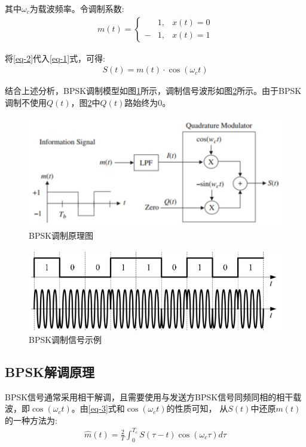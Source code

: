 \documentclass[12pt]{ctexart}
\begin{document}
\noindent 其中$\omega_c$为载波频率。令调制系数:
\begin{align}
	m(t) = 
	\left\{\begin{aligned}
		& 1, & x(t) = 0 \\
		−&1, & x(t) = 1
	\end{aligned}\right.
	\label{eq-2}
\end{align}

\noindent 将\eqref{eq-2}代入\eqref{eq-1}式，可得:
\begin{align}
	S(t) = m(t) \cdot \cos(\omega_c t)
	\label{eq-3}
\end{align}

	结合上述分析，BPSK调制模型如图\ref{mod-prin}所示，调制信号波形如图\ref{mod-exp}所示。由于BPSK调制不使用$Q(t)$，图\ref{mod-exp}中$Q(t)$路始终为$0$。

\begin{figure}[htbp]
	\centering
 	\includegraphics[scale=0.5]{../figures/mod-prin.png}
	\caption{BPSK调制原理图}
	\label{mod-prin}
\end{figure}

\begin{figure}[htbp]
	\centering
 	\includegraphics[scale=0.5]{../figures/mod-exp.png}
	\caption{BPSK调制信号示例}
	\label{mod-exp}
\end{figure}

\subsection{BPSK解调原理}
	BPSK信号通常采用相干解调，且需要使用与发送方BPSK信号同频同相的相干载
波，即$\cos(\omega_c t)$。由\eqref{eq-3}式和$\cos(\omega_c t)$的性质可知，
从$S(t)$中还原$m(t)$的一种方法为:
\begin{align}
	\hat m(t) = 
	\frac{2}{T} \int_0^{T_c} S(\tau − t) \cos(\omega_c \tau) d\tau
	\label{eq-4}
\end{align}
\end{document}
